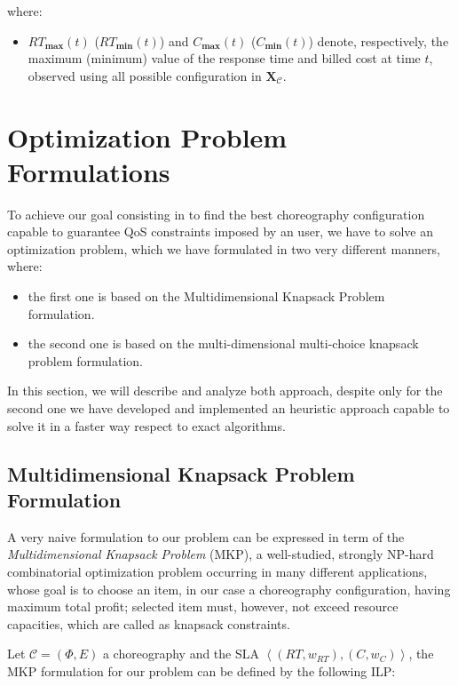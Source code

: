 \documentclass[12pt,a4paper]{report}
\begin{document}
where:

\begin{itemize}
	\item $RT_{\textbf{max}}(t)$ ($RT_{\textbf{min}}(t)$) and $C_{\textbf{max}}(t)$ ($C_{\textbf{min}}(t)$) denote, respectively, the maximum (minimum) value of the response time and billed cost at time $t$, observed using all possible configuration in $\textbf{X}_{\mathcal{C}}$.
\end{itemize}

\section{Optimization Problem Formulations}

To achieve our goal consisting in to find the best choreography configuration capable to guarantee QoS constraints imposed by an user, we have to solve an optimization problem, which we have formulated in two very different manners, where:

\begin{itemize}
	\item the first one is based on the Multidimensional Knapsack Problem formulation.
	\item the second one is based on the multi-dimensional multi-choice knapsack problem formulation. 
\end{itemize}

In this section, we will describe and analyze both approach, despite only for the second one we have developed and implemented an heuristic approach capable to solve it in a faster way respect to exact algorithms. 

\subsection{Multidimensional Knapsack Problem Formulation}

A very naive formulation to our problem can be expressed in term of the \textit{Multidimensional Knapsack Problem} (MKP), a well-studied, strongly NP-hard combinatorial optimization problem occurring in many different applications, whose goal is to choose an item, in our case a choreography configuration, having maximum total profit; selected item  must, however, not exceed resource capacities, which are called as knapsack constraints.

Let $\mathcal{C} = (\Phi,E)$ a choreography and the SLA $\left\langle (RT,w_{RT}),(C,w_{C}) \right\rangle$, the MKP formulation for our problem can be defined by the following ILP:
\end{document}
